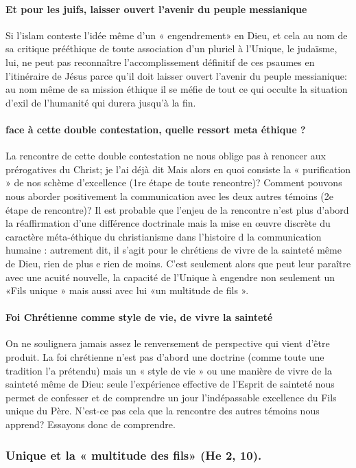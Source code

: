 \paragraph{Et pour les juifs, laisser ouvert l'avenir du peuple messianique}
Si l'islam conteste l'idée même d'un « engendrement» en Dieu, et cela au nom de sa critique prééthique de toute association d'un pluriel à l'Unique, le judaïsme, lui, ne peut pas reconnaître l'accomplissement définitif de ces psaumes en l'itinéraire de Jésus parce qu'il doit laisser ouvert l'avenir du peuple messianique: au nom même de sa mission éthique il se méfie de tout ce qui occulte la situation d'exil de l'humanité qui durera jusqu'à la fin.

\paragraph{face à cette double contestation, quelle ressort meta éthique ?}
La rencontre de cette double contestation ne nous oblige pas à renoncer aux prérogatives du Christ; je l'ai déjà dit Mais alors en quoi consiste la « purification » de nos schème d'excellence (1re étape de toute rencontre)? Comment pouvons nous aborder positivement la communication avec les deux autres témoins (2e étape de rencontre)? Il est probable que l'enjeu de la rencontre n'est plus d'abord la réaffirmation d'une différence doctrinale mais la mise en œuvre discrète du caractère méta-éthique du christianisme dans l'histoire d la communication humaine : autrement dit, il s'agit pour le chrétiens de vivre de la sainteté même de Dieu, rien de plus e rien de moins. C'est seulement alors que peut leur paraître avec une acuité nouvelle, la capacité de l'Unique à engendre non seulement un «Fils unique » mais aussi avec lui «un multitude de fils ».
\paragraph{Foi Chrétienne comme style de vie, de vivre la sainteté}
On ne soulignera jamais assez le renversement de perspective qui vient d'être produit. La foi chrétienne n'est pas d'abord une doctrine (comme toute une tradition l'a prétendu) mais un « style de vie » ou une manière de vivre de la sainteté même de Dieu: seule l'expérience effective de l'Esprit de sainteté nous permet de confesser et de comprendre un jour l'indépassable excellence du Fils unique du Père. N'est-ce pas cela que la rencontre des autres témoins nous apprend?
Essayons donc de comprendre.
\subsubsection{Unique et la « multitude des fils» (He 2, 10).}
